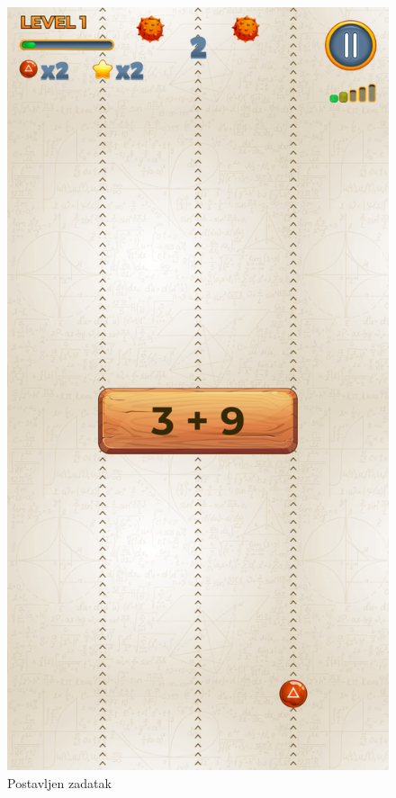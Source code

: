 \documentclass[times, utf8, zavrsni]{fer}
\begin{document}
			\begin{figure}[!htb]
			\begin{minipage}{0.48\textwidth}
				\centering
				\includegraphics[scale=0.15]{"slike/igre/mathematicalrun1.png"} 
				\caption{Postavljen zadatak}

\end{minipage}
\end{figure}
\end{document}
